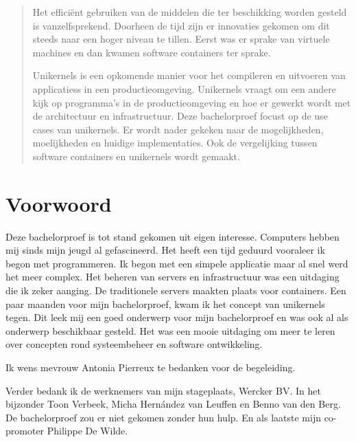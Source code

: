 \documentclass[pdftex,a4paper,12pt,twoside]{report}
\begin{document}
\begin{abstract}

Het efficiënt gebruiken van de middelen die ter beschikking worden gesteld is vanzelfsprekend. Doorheen de tijd zijn er innovaties gekomen om dit steeds naar een hoger niveau te tillen. Eerst was er sprake van virtuele machines en dan kwamen software containers ter sprake.

Unikernels is een opkomende manier voor het compileren en uitvoeren van applicatiess in een productieomgeving. Unikernels vraagt om een andere kijk op programma's in de productieomgeving en hoe er gewerkt wordt met de architectuur en infrastructuur. Deze bachelorproef focust op de use cases van unikernels. Er wordt nader gekeken naar de mogelijkheden, moelijkheden en huidige implementaties. Ook de vergelijking tussen software containers en unikernels wordt gemaakt.

\end{abstract}

\chapter*{Voorwoord}
\label{ch:voorwoord}

Deze bachelorproef is tot stand gekomen uit eigen interesse. Computers hebben mij sinds mijn jeugd al gefascineerd. Het heeft een tijd geduurd vooraleer ik begon met programmeren. Ik begon met een simpele applicatie maar al snel werd het meer complex. Het beheren van servers en infrastructuur was een uitdaging die ik zeker aanging. De traditionele servers maakten plaats voor containers. Een paar maanden voor mijn bachelorproef, kwam ik het concept van unikernels tegen. Dit leek mij een goed onderwerp voor mijn bachelorproef en was ook al als onderwerp beschikbaar gesteld. Het was een mooie uitdaging om meer te leren over concepten rond systeembeheer en software ontwikkeling.

Ik wens mevrouw Antonia Pierreux te bedanken voor de begeleiding.

Verder bedank ik de werknemers van mijn stageplaats, Wercker BV. In het bijzonder Toon Verbeek, Micha Hernández van Leuffen en Benno van den Berg. De bachelorproef zou er niet gekomen zonder hun hulp. En als laatste mijn co-promoter Philippe De Wilde.

\tableofcontents




\end{document}
